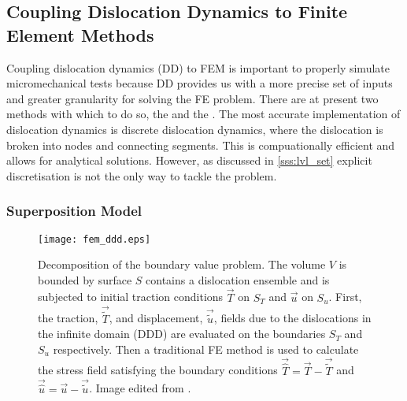 \subsection{Coupling Dislocation Dynamics to Finite Element Methods}
\label{ss:ddd_fem}
Coupling dislocation dynamics (DD) to FEM is important to properly simulate micromechanical tests because DD provides us with a more precise set of inputs and greater granularity for solving the FE problem. There are at present two methods with which to do so, the  and the . The most accurate implementation of dislocation dynamics is discrete dislocation dynamics, where the dislocation is broken into nodes and connecting segments. This is compuationally efficient and allows for analytical solutions. However, as discussed in \cref{sss:lvl_set} explicit discretisation is not the only way to tackle the problem.

\subsubsection{Superposition Model}
\label{sss:superposition}
\begin{figure}
	\centering
	\texttt{[image: fem\_ddd.eps]}
	\caption[Superposition Model for DDD-FEM coupling.]{Decomposition of the boundary value problem. The volume $ V $ is bounded by surface $ S $ contains a dislocation ensemble and is subjected to initial traction conditions $ \vec{T} $ on $ S_{T} $ and $ \vec{u} $ on $ S_{u} $. First, the traction, $ \vec{\tilde{T}} $, and displacement, $\vec{\tilde{u}}$, fields due to the dislocations in the infinite domain (DDD) are evaluated on the boundaries $ S_{T} $ and $ S_{u} $ respectively. Then a traditional FE method is used to calculate the stress field satisfying the boundary conditions $ \vec{\hat{T}} = \vec{T} - \vec{\tilde{T}} $ and $ \vec{\hat{u}} = \vec{u} - \vec{\tilde{u}} $. Image edited from \cite{analytic_tractions}.}
	\label{fig:fem_ddd}
\end{figure}

